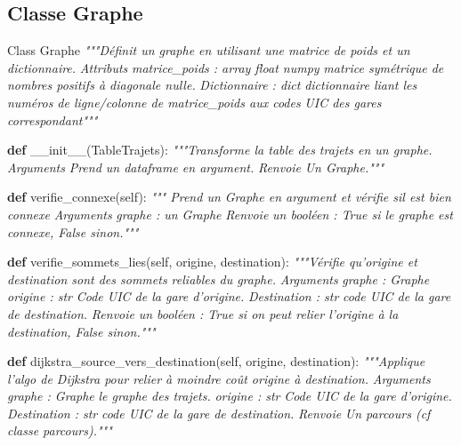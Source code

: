 \documentclass[
]{article}
\newenvironment{Shaded}{\begin{snugshade}}{\end{snugshade}}
\newcommand{\CommentTok}[1]{\textcolor[rgb]{0.56,0.35,0.01}{\textit{#1}}}
\newcommand{\FunctionTok}[1]{\textcolor[rgb]{0.00,0.00,0.00}{#1}}
\newcommand{\KeywordTok}[1]{\textcolor[rgb]{0.13,0.29,0.53}{\textbf{#1}}}
\newcommand{\NormalTok}[1]{#1}
\newcommand{\VariableTok}[1]{\textcolor[rgb]{0.00,0.00,0.00}{#1}}
\begin{document}
\hypertarget{classe-graphe}{%
\subsection{Classe Graphe}\label{classe-graphe}}

\begin{Shaded}
\begin{Highlighting}[]
\NormalTok{Class Graphe}
    \CommentTok{"""Définit un graphe en utilisant une matrice de poids et un dictionnaire.}
\CommentTok{    Attributs}
\CommentTok{        matrice\_poids : array float numpy}
\CommentTok{            matrice symétrique de nombres positifs à diagonale nulle.}
\CommentTok{        Dictionnaire : dict}
\CommentTok{            dictionnaire liant les numéros de ligne/colonne de matrice\_poids aux codes }
\CommentTok{            UIC des gares correspondant"""}

  \KeywordTok{def} \FunctionTok{\_\_init\_\_}\NormalTok{(TableTrajets):}
    \CommentTok{"""Transforme la table des trajets en un graphe.}
\CommentTok{      Arguments}
\CommentTok{        Prend un dataframe en argument.}
\CommentTok{      Renvoie}
\CommentTok{          Un Graphe."""}

  \KeywordTok{def}\NormalTok{ verifie\_connexe(}\VariableTok{self}\NormalTok{):}
    \CommentTok{""" Prend un Graphe en argument et vérifie s\textquotesingle{}il est bien connexe}
\CommentTok{    Arguments}
\CommentTok{          graphe : un Graphe}
\CommentTok{      Renvoie}
\CommentTok{        un booléen : True si le graphe est connexe, False sinon."""}

  \KeywordTok{def}\NormalTok{ verifie\_sommets\_lies(}\VariableTok{self}\NormalTok{, origine, destination):}
    \CommentTok{"""Vérifie qu’origine et destination sont des sommets reliables du graphe.}
\CommentTok{      Arguments}
\CommentTok{          graphe : Graphe}
\CommentTok{          origine : str}
\CommentTok{              Code UIC de la gare d’origine.}
\CommentTok{          Destination : str}
\CommentTok{              code UIC de la gare de destination.}
\CommentTok{        Renvoie}
\CommentTok{          un booléen : True si on peut relier l’origine à la destination, False sinon."""}

  \KeywordTok{def}\NormalTok{ dijkstra\_source\_vers\_destination(}\VariableTok{self}\NormalTok{, origine, destination):}
      \CommentTok{"""Applique l’algo de Dijkstra pour relier à moindre coût origine à destination.}
\CommentTok{    Arguments}
\CommentTok{          graphe : Graphe}
\CommentTok{              le graphe des trajets.}
\CommentTok{          origine : str}
\CommentTok{              Code UIC de la gare d’origine.}
\CommentTok{          Destination : str}
\CommentTok{              code UIC de la gare de destination.}
\CommentTok{      Renvoie}
\CommentTok{          Un parcours (cf classe parcours)."""}      


\end{Highlighting}
\end{Shaded}
\end{document}
